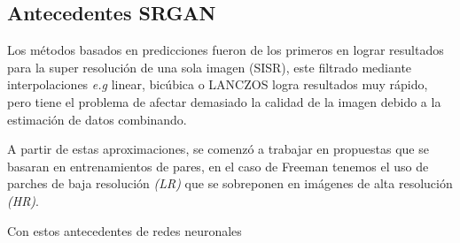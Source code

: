 \subsection{Antecedentes SRGAN}

Los métodos basados en predicciones fueron de los primeros en lograr resultados para la
super resolución de una sola imagen (SISR), este filtrado mediante interpolaciones \emph{e.g} 
linear, bicúbica o LANCZOS logra resultados muy rápido, pero tiene el problema
de afectar demasiado la calidad de la imagen debido a la estimación de datos combinando. 

A partir de estas aproximaciones, se comenzó a trabajar en propuestas que se basaran en 
entrenamientos de pares, en el caso de Freeman \cite{freeman} tenemos el uso de parches de baja 
resolución \emph{(LR)} que se sobreponen en imágenes de alta resolución \emph{(HR)}.

Con estos antecedentes de redes neuronales